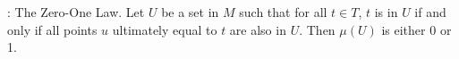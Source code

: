 : The Zero-One Law. Let $U$ be a set in $M$ such that for all $t \in T$, $t$ is in $U$ if and only if all points $u$ ultimately equal to $t$ are also in $U$. Then $\mu(U)$ is either 0 or 1.